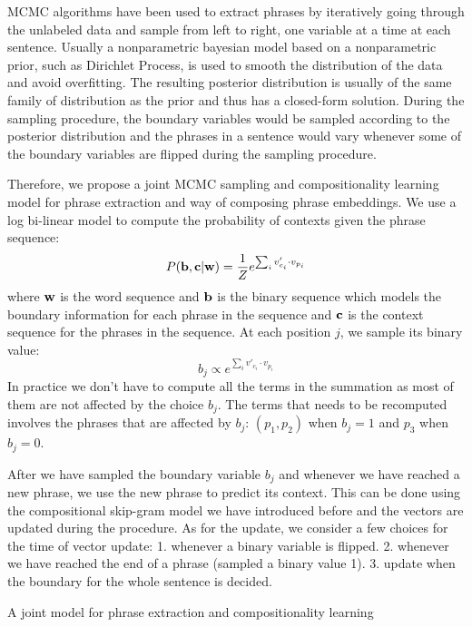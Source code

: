 MCMC algorithms have been used to extract phrases by iteratively going through the unlabeled data and sample from left to right, one variable at a time
at each sentence. Usually a nonparametric bayesian model based on a nonparametric prior, such as Dirichlet Process, is used to smooth the distribution of
the data and avoid overfitting. The resulting posterior distribution is usually of the same family of distribution as the prior and thus 
has a closed-form solution. During the sampling procedure, the boundary variables would be sampled according to the posterior distribution and the phrases
in a sentence would vary whenever some of the boundary variables are flipped during the sampling procedure.


Therefore, we propose a joint MCMC sampling and compositionality learning model for phrase extraction and way of composing phrase embeddings. We use a log bi-linear
model to compute the probability of contexts given the phrase sequence:
$$P({\bf b},{\bf c}|{\bf w})= \frac{1}{Z}e^{\sum_i v'_{c_i} \cdot v_{p_i}}$$
where ${\bf w}$ is the word sequence and ${\bf b}$ is the binary sequence which models the boundary information for each phrase in the sequence and ${\bf c}$ is the context sequence for the phrases in the sequence.
At each position $j$, we sample its binary value:
$$b_j \propto e^{\sum_i v'_{c_i} \cdot v_{p_i}}$$
In practice we don't have to compute all the terms in the summation as most of them are not affected by the choice $b_j$. The terms that needs to be recomputed
involves the phrases that are affected by $b_j$: $(p_1, p_2)$ when $b_j=1$ and $p_3$ when $b_j=0$. 


After we have sampled the boundary variable $b_j$ and whenever we have reached a new phrase, we use the new phrase to predict its context. This can be done using
the compositional skip-gram model we have introduced before and the vectors are updated during the procedure. As for the update, we consider a few choices for the time
of vector update: 1. whenever a binary variable is flipped. 2. whenever we have reached the end of a phrase (sampled a binary value 1). 3. update when the boundary for the
whole sentence is decided.
\begin{algorithm}[t]
\small
\caption{A joint model for phrase extraction and compositionality learning}
\begin{algorithmic}[1]
            \ENDIF
        \ENDFOR
    \ENDFOR
\ENDFOR
\end{algorithmic}
\label{alg:joint}
\end{algorithm}
